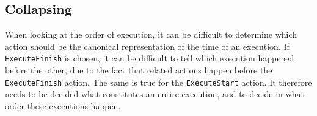 	
	
	

	\subsection{Collapsing}
	When looking at the order of execution, it can be difficult to determine which action should be the canonical representation of the time of an execution. If \texttt{ExecuteFinish} is chosen, it can be difficult to tell which execution happened before the other, due to the fact that related actions happen before the \texttt{ExecuteFinish} action. 
	The same is true for the \texttt{ExecuteStart} action. It therefore needs to be decided what constitutes an entire execution, and to decide in what order these executions happen.
	
